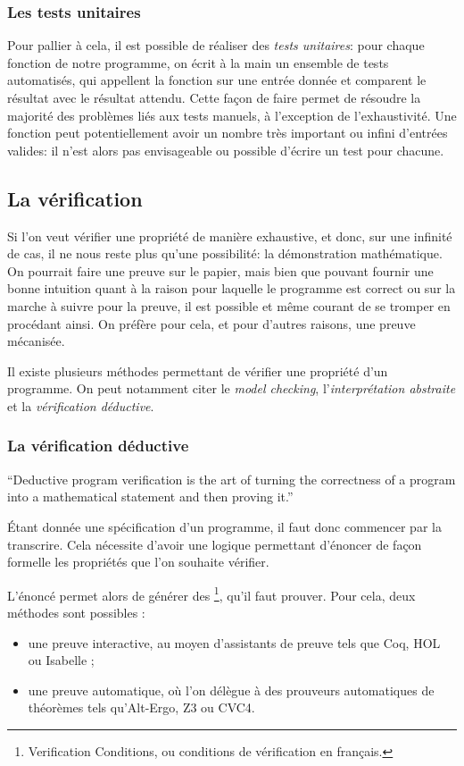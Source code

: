     \subsubsection{Les tests unitaires}
Pour pallier à cela, il est possible de réaliser des \emph{tests unitaires}: pour chaque fonction de notre programme, on écrit à la main un ensemble de tests automatisés, qui appellent la fonction sur une entrée donnée et comparent le résultat avec le résultat attendu. Cette façon de faire permet de résoudre la majorité des problèmes liés aux tests manuels, à l'exception de l'exhaustivité. Une fonction peut potentiellement avoir un nombre très important ou infini d'entrées valides: il n'est alors pas envisageable ou possible d'écrire un test pour chacune.

  \subsection{La vérification}
  Si l'on veut vérifier une propriété de manière exhaustive, et donc, sur une infinité de cas, il ne nous reste plus qu'une possibilité: la démonstration mathématique. On pourrait faire une preuve sur le papier, mais bien que pouvant fournir une bonne intuition quant à la raison pour laquelle le programme est correct ou sur la marche à suivre pour la preuve, il est possible et même courant de se tromper en procédant ainsi. On préfère pour cela, et pour d'autres raisons, une preuve mécanisée.

Il existe plusieurs méthodes permettant de vérifier une propriété d'un programme. On peut notamment citer le \emph{model checking}, l'\emph{interprétation abstraite} et la \emph{vérification déductive}.

  \subsubsection{La vérification déductive}

    \enquote{Deductive program verification is the art of turning the correctness of a program into a mathematical statement and then proving it.}\cite{Filliatre11}

    Étant donnée une spécification d'un programme, il faut donc commencer par la transcrire. Cela nécessite d'avoir une logique permettant d'énoncer de façon formelle les propriétés que l'on souhaite vérifier.

    L'énoncé permet alors de générer des \footnote{Verification Conditions, ou conditions de vérification en français.}, qu'il faut prouver. Pour cela, deux méthodes sont possibles :
    \begin{itemize}
      \item une preuve interactive, au moyen d'assistants de preuve tels que Coq, HOL ou Isabelle ;
      \item une preuve automatique, où l'on délègue à des prouveurs automatiques de théorèmes tels qu'Alt-Ergo, Z3 ou CVC4.
    \end{itemize}


